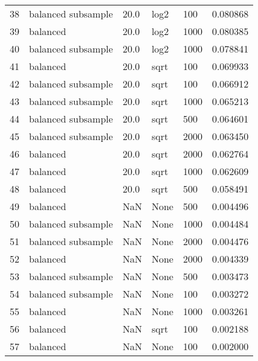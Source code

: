 \documentclass[
    iict, %
    il, %
]{heig-tb}
\begin{document}
\begin{table}[H]
\begin{center}
\begin{tabular}{llllll}
            38   & balanced subsample & 20.0      & log2         & 100          & 0.080868 \\
            39   & balanced           & 20.0      & log2         & 1000         & 0.080385 \\
            40   & balanced subsample & 20.0      & log2         & 1000         & 0.078841 \\
            41   & balanced           & 20.0      & sqrt         & 100          & 0.069933 \\
            42   & balanced subsample & 20.0      & sqrt         & 100          & 0.066912 \\
            43   & balanced subsample & 20.0      & sqrt         & 1000         & 0.065213 \\
            44   & balanced subsample & 20.0      & sqrt         & 500          & 0.064601 \\
            45   & balanced subsample & 20.0      & sqrt         & 2000         & 0.063450 \\
            46   & balanced           & 20.0      & sqrt         & 2000         & 0.062764 \\
            47   & balanced           & 20.0      & sqrt         & 1000         & 0.062609 \\
            48   & balanced           & 20.0      & sqrt         & 500          & 0.058491 \\
            49   & balanced           & NaN       & None         & 500          & 0.004496 \\
            50   & balanced subsample & NaN       & None         & 1000         & 0.004484 \\
            51   & balanced subsample & NaN       & None         & 2000         & 0.004476 \\
            52   & balanced           & NaN       & None         & 2000         & 0.004339 \\
            53   & balanced subsample & NaN       & None         & 500          & 0.003473 \\
            54   & balanced subsample & NaN       & None         & 100          & 0.003272 \\
            55   & balanced           & NaN       & None         & 1000         & 0.003261 \\
            56   & balanced           & NaN       & sqrt         & 100          & 0.002188 \\
            57   & balanced           & NaN       & None         & 100          & 0.002000 \\

\end{tabular}
\end{center}
\end{table}
\end{document}
